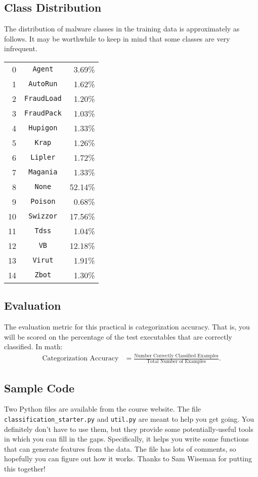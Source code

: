 \documentclass[12pt]{article}
\begin{document}
\subsection*{Class Distribution}
The distribution of malware classes in the training data is approximately as follows. It may be worthwhile to keep in mind that some classes are very infrequent.
\begin{center}
\begin{tabular}{r c r}
    0 &\verb|Agent| & 3.69\% \\
    1 &\verb|AutoRun| & 1.62\% \\
    2 &\verb|FraudLoad| & 1.20\%\\
    3 &\verb|FraudPack| & 1.03\%\\
    4 &\verb|Hupigon| & 1.33\%\\
    5 &\verb|Krap| & 1.26\%    \\
    6 &\verb|Lipler| & 1.72\%\\
    7 &\verb|Magania| & 1.33\%\\
    8 &\verb|None| & 52.14\%\\
    9 &\verb|Poison| & 0.68\%\\
    10 &\verb|Swizzor| & 17.56\%\\
    11 &\verb|Tdss| & 1.04\%\\
    12 &\verb|VB| & 12.18\%\\
    13 &\verb|Virut| & 1.91\%\\
    14 &\verb|Zbot| & 1.30\%
    \end{tabular}
    \end{center}

\subsection*{Evaluation}
The evaluation metric for this practical is categorization accuracy. That is, you will be scored on the percentage of the test executables that are correctly classified. In math: 
\begin{align*}
    \text{Categorization Accuracy} &= \frac{\text{Number Correctly Classified Examples}}{\text{Total Number of Examples}}.
\end{align*}

\subsection*{Sample Code}
Two Python files are available from the course website.  The file \verb|classification_starter.py| and \verb|util.py| are meant to help you get going.  You definitely don't have to use them, but they provide some potentially-useful tools in which you can fill in the gaps.  Specifically, it helps you write some functions that can generate features from the data.  The file has lots of comments, so hopefully you can figure out how it works. Thanks to Sam Wiseman for putting this together!
\end{document}
